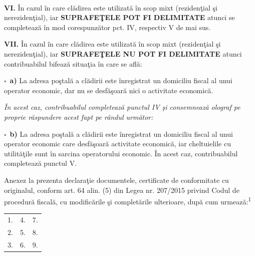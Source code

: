 \documentclass[10pt,a4paper,landscape]{article}
\newcommand{\fillline}[1][6cm]{\underline{\hspace{#1}}}
\newcommand{\checkboxempty}{$\square$}
\begin{document}
\vspace{0.3cm}
\hrulefill \\
\hrulefill

\vspace{0.5cm}

\textbf{VI.} În cazul în care clădirea este utilizată în scop mixt (rezidenţial şi nerezidenţial), iar \textbf{SUPRAFEŢELE POT FI DELIMITATE} atunci se completează în mod corespunzător pct. IV, respectiv V de mai sus.

\vspace{0.3cm}

\textbf{VII.} În cazul în care clădirea este utilizată în scop mixt (rezidenţial şi nerezidenţial), iar \textbf{SUPRAFEŢELE NU POT FI DELIMITATE} atunci contribuabilul bifează situaţia în care se află:

\vspace{0.2cm}

\checkboxempty\ \textbf{a)} La adresa poştală a clădirii este înregistrat un domiciliu fiscal al unui operator economic, dar nu se desfăşoară nici o activitate economică.

\textit{În acest caz, contribuabilul completează punctul IV şi consemnează olograf pe proprie răspundere acest fapt pe rândul următor:}\\
\hrulefill

\vspace{0.2cm}

\checkboxempty\ \textbf{b)} La adresa poştală a clădirii este înregistrat un domiciliu fiscal al unui operator economic care desfăşoară activitate economică, iar cheltuielile cu utilităţile sunt în sarcina operatorului economic. În acest caz, contribuabilul completează punctul V.

\vspace{0.5cm}

Anexez la prezenta declaraţie documentele, certificate de conformitate cu originalul, conform art. 64 alin. (5) din Legea nr. 207/2015 privind Codul de procedură fiscală, cu modificările şi completările ulterioare, după cum urmează:\textsuperscript{1}

\begin{tabularx}{\textwidth}{XXX}
1. \fillline[5cm] & 4. \fillline[5cm] & 7. \fillline[5cm] \\
2. \fillline[5cm] & 5. \fillline[5cm] & 8. \fillline[5cm] \\
3. \fillline[5cm] & 6. \fillline[5cm] & 9. \fillline[5cm] \\
\end{tabularx}
\end{document}
